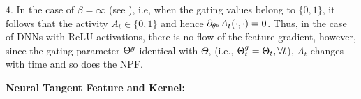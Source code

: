 $4.$ In the case of $\beta=\infty$ (see ), i.e, when the gating values belong to $\{0,1\}$, it follows that the activity $A_t\in\{0,1\}$ and hence $\partial_{\theta^g} A_t(\cdot,\cdot)=0$. Thus, in the case of DNNs with ReLU activations, there is no flow of the feature gradient, however, since the gating parameter ${\Theta}^g$ identical with $\Theta$, (i.e., ${\Theta}^g_t=\Theta_t,\forall t$), $A_t$ changes with time and so does the NPF. \\
\begin{comment}
\begin{definition}\label{def:delta}
$\delta_t(s,s')=\sum_{p\rsa i} \ip{\varphi^a_{x_s,p,t},\varphi^a_{x_{s'},p,t}}$, for $s,s'\in[n]$, using any $i\in[d_{in}]$.
\end{definition}
\textbf{Gradient Flow via Sub-Networks:} Note that in the case of $\beta=\infty$ (see \Cref{tb:dgn}), i.e, when the gating values belong to $\{0,1\}$, it follows that the activity $A_t\in\{0,1\}$, and hence AD and FG are $0$. Thus, in the case of DNNs with ReLU activations, there is no flow of the feature gradient, however, since the gating parameter $\Tg$ identical with $\Theta$, (i.e., $\Tg_t=\Theta_t,\forall t$), $A_t$ changes with time and so does the NPF. In the case of $\beta>0$, for an input $x\in\R^{d_{in}}$, let $\N^{\S}_{x,t}(\tau_{\S})=\{p\in[P]: |\partial_{\tg} A_t(x,p)|>\tau_{\S}\}$ be the set of paths, which have activations whose gradient to any of $\Tg\inrdnet$ is greater than some threshold $\tau>0$. Note that when all the gates are close to $1$ in a path $p$, then it follows that $\partial A_t(x_s,p)$ will be very small. Thus, using the property that the slope of the sigmoid diminishes in the extremities, we can reason that for appropriate choices of $\tau_{\A}$ (sufficiently close to $1$) and $\tau_{\S}$ (large enough), $\P^{\S}(\tau_{S})\cup \P^{\A}(\tau_{\A})=\emptyset$. Thus, there are two separate networks for the two separate gradient flows, i.e., the value gradient flow via the active sub-network and the feature gradient flow via the sensitive sub-network.\\
\end{comment}
\textbf{Neural Tangent Feature and Kernel:}
\FloatBarrier

